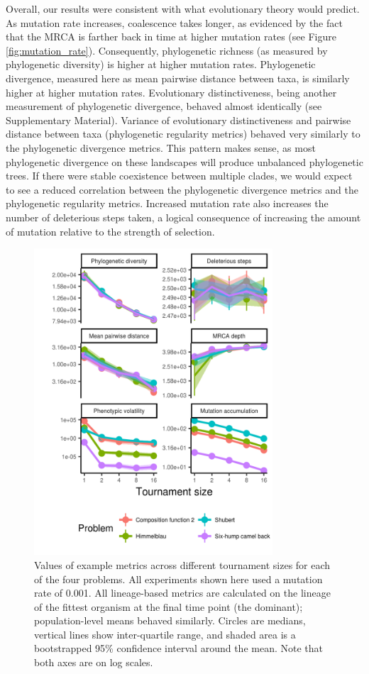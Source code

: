 \documentclass[letterpaper]{article}
\begin{document}
Overall, our results were consistent with what evolutionary theory would predict. As mutation rate increases, coalescence takes longer, as evidenced by the fact that the MRCA is farther back in time at higher mutation rates (see Figure \ref{fig:mutation_rate}). Consequently, phylogenetic richness (as measured by phylogenetic diversity) is higher at higher mutation rates. Phylogenetic divergence, measured here as mean pairwise distance between taxa, is similarly higher at higher mutation rates. Evolutionary distinctiveness, being another measurement of phylogenetic divergence, behaved almost identically (see Supplementary Material). Variance of evolutionary distinctiveness and pairwise distance between taxa (phylogenetic regularity metrics) behaved very similarly to the phylogenetic divergence metrics. This pattern makes sense, as most phylogenetic divergence on these landscapes will produce unbalanced phylogenetic trees. If there were stable coexistence between multiple clades, we would expect to see a reduced correlation between the phylogenetic divergence metrics and the phylogenetic regularity metrics. Increased mutation rate also increases the number of deleterious steps taken, a logical consequence of increasing the amount of mutation relative to the strength of selection.

\begin{figure}
\includegraphics[width=3.5in]{figs/all_ts.png}
\caption{\small Values of example metrics across different tournament sizes for each of the four problems. All experiments shown here used a mutation rate of 0.001. All lineage-based metrics are calculated on the lineage of the fittest organism at the final time point (the dominant); population-level means behaved similarly. Circles are medians, vertical lines show inter-quartile range, and shaded area is a bootstrapped 95\% confidence interval around the mean. Note that both axes are on log scales.}
\label{fig:ts}
\end{figure}
\end{document}
